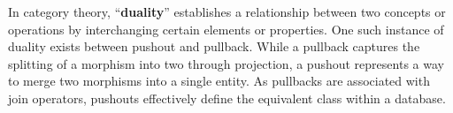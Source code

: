 In category theory, ``\textbf{duality}'' establishes a relationship between two concepts or operations by interchanging certain elements or properties. One such instance of duality exists between pushout and pullback. While a pullback captures the splitting of a morphism into two through projection, a pushout represents a way to merge two morphisms into a single entity. As pullbacks are associated with join operators, pushouts effectively define the equivalent class within a  database.










